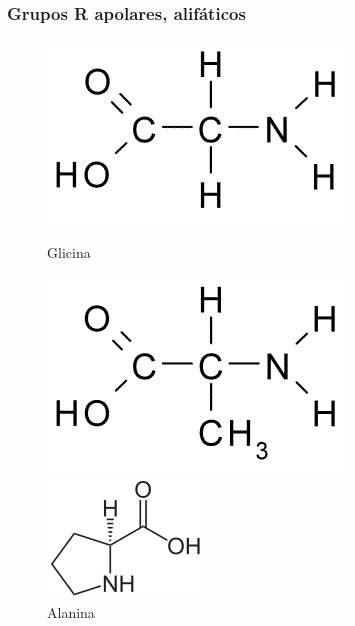 \subsubsection*{Grupos R apolares, alifáticos}
\begin{figure}[H]
	\begin{center}
		\begin{minipage}{0.24\linewidth}
			\centering   
			\includegraphics[width=0.95\linewidth]{secProteins/figures/glycine.png}	
			\caption{Glicina}
			\label{fig:glycine}
		\end{minipage}
		\begin{minipage}{0.24\linewidth}
			\centering   
			\includegraphics[width=0.9\linewidth]{secProteins/figures/alanine.png}
			\caption{Alanina}
			\label{fig:alanine}
		\end{minipage}
		\begin{minipage}{0.24\linewidth}
			\centering   
			\includegraphics[width=0.8\linewidth]{secProteins/figures/proline.png}

\end{minipage}
\end{center}
\end{figure}
